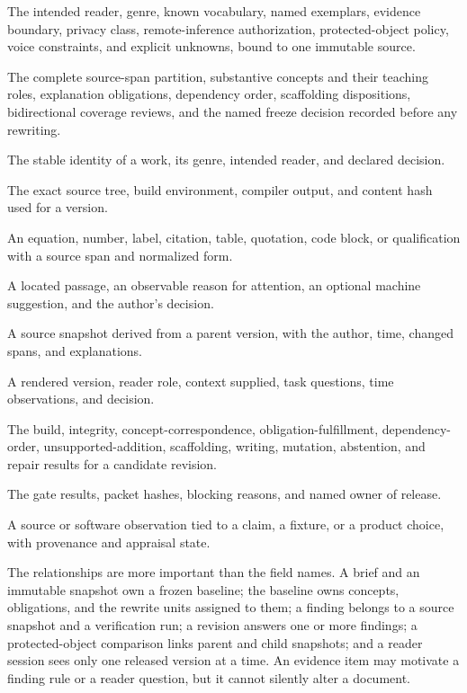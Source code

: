 \begin{description}[style=nextline,leftmargin=37mm,labelindent=0mm]
\item[Humanization brief] The intended reader, genre, known vocabulary, named
exemplars, evidence boundary, privacy class, remote-inference authorization,
protected-object policy, voice constraints, and explicit unknowns, bound to one
immutable source.
\item[Concept baseline] The complete source-span partition, substantive concepts
and their teaching roles, explanation obligations, dependency order, scaffolding
dispositions, bidirectional coverage reviews, and the named freeze decision
recorded before any rewriting.
\item[Document] The stable identity of a work, its genre, intended reader, and
declared decision.
\item[Source snapshot] The exact source tree, build environment, compiler
output, and content hash used for a version.
\item[Protected object] An equation, number, label, citation, table, quotation,
code block, or qualification with a source span and normalized form.
\item[Finding] A located passage, an observable reason for attention, an
optional machine suggestion, and the author's decision.
\item[Revision] A source snapshot derived from a parent version, with the
author, time, changed spans, and explanations.
\item[Reader session] A rendered version, reader role, context supplied, task
questions, time observations, and decision.
\item[Semantic preflight result] The build, integrity, concept-correspondence,
obligation-fulfillment, dependency-order, unsupported-addition, scaffolding,
writing, mutation, abstention, and repair results for a candidate revision.
\item[Release decision] The gate results, packet hashes, blocking reasons, and
named owner of release.
\item[Evidence item] A source or software observation tied to a claim, a
fixture, or a product choice, with provenance and appraisal state.
\end{description}

The relationships are more important than the field names. A brief and an
immutable snapshot own a frozen baseline; the baseline owns concepts,
obligations, and the rewrite units assigned to them; a finding belongs to a
source snapshot and a verification run; a revision answers one or more findings;
a protected-object comparison links parent and child snapshots; and a reader
session sees only one released version at a time. An evidence item may motivate
a finding rule or a reader question, but it cannot silently alter a document.

